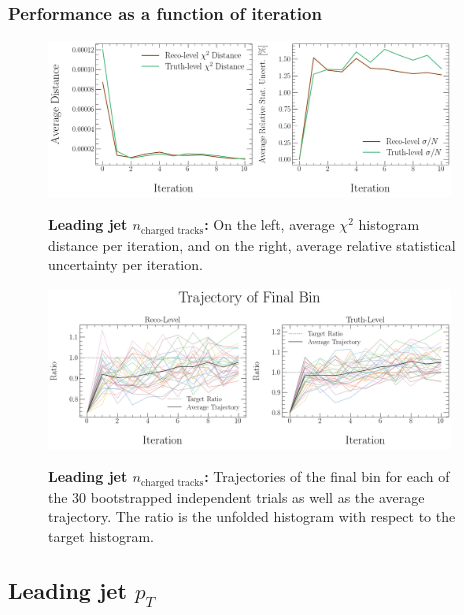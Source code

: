 \subsubsection{Performance as a function of iteration}
\begin{figure}[!htb]
\centering
\includegraphics[width=0.95\textwidth]{figures/num_iterations_study/Ntracks_trackj1/iteration_study_30x10-distances-and-stat-uncert.png}\\
\caption{\textbf{Leading jet $n_{\text{charged tracks}}$:} On the left, average $\chi^2$ histogram distance per iteration, and on the right, average relative statistical uncertainty per iteration.}
\label{fig:num_iterations:ntracks_distances_stat_uncert}
\end{figure}
\begin{figure}[!htb]
\centering
\includegraphics[width=0.95\textwidth]{figures/num_iterations_study/Ntracks_trackj1/iteration_study_30x10-final_bin.png}\\
\caption{\textbf{Leading jet $n_{\text{charged tracks}}$:} Trajectories of the final bin for each of the 30 bootstrapped independent trials as well as the average trajectory. The ratio is the unfolded histogram with respect to the target histogram.}
\label{fig:num_iterations:ntracks_final_bin}
\end{figure}


\subsection{Leading jet $p_T$}
